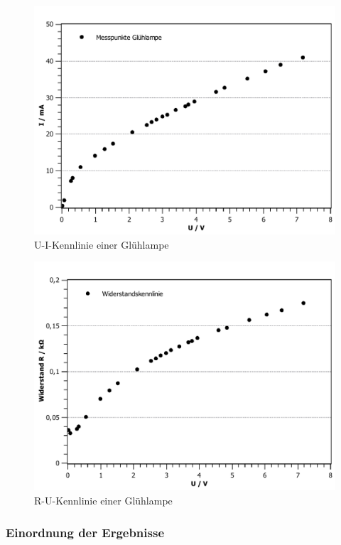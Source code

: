 \documentclass[11pt,a4paper,titlepage, ngerman]{article}
\begin{document}
				\begin{figure}[ht]
					\centering
					\includegraphics[width=\textwidth]{KennlinieGluehlampe_2.pdf}
					\caption{U-I-Kennlinie einer Glühlampe}
					\label{KL c}
				\end{figure}
				\begin{figure}[ht]
					\centering
					\includegraphics[width=\textwidth]{KennlinieGluehlampeWiderstand_2.pdf}
					\caption{R-U-Kennlinie einer Glühlampe}
					\label{R c}
				\end{figure}
			
			\subsubsection*{Einordnung der Ergebnisse}
						
\end{document}
